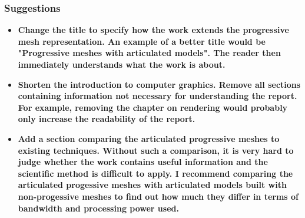 \documentclass{article}
\begin{document}
\subsubsection{Suggestions}
\begin{itemize}
  \item \textbf{Change the title to specify how the work extends the progressive mesh
      representation. An example of a better title would be "Progressive
      meshes with articulated models". The reader then immediately understands
    what the work is about.}
  \item \textbf{Shorten the introduction to computer graphics. Remove all sections
      containing information not necessary for understanding the report. For
      example, removing the chapter on rendering would probably only increase the
    readability of the report.}
  \item \textbf{Add a section comparing the articulated progressive meshes to existing
      techniques. Without such a comparison, it is very hard to judge whether
      the work contains useful information and the scientific method is difficult
      to apply. I recommend comparing the articulated progessive meshes with
      articulated models built with non-progessive meshes to find out how much
    they differ in terms of bandwidth and processing power used.}
\end{itemize}


\end{document}
